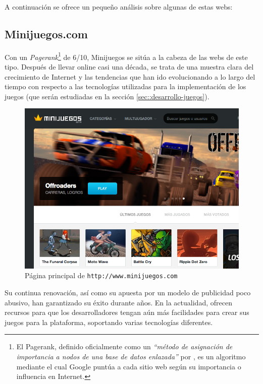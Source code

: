 A continuación se ofrece un pequeño análisis sobre algunas de estas webs:

\subsection*{Minijuegos.com}

Con un {\it Pagerank}\footnote{El Pagerank, definido oficialmente como un {\it ``método de asignación de importancia a nodos de una base de datos enlazada''} por \cite{Lawrence2007}, es un algoritmo mediante el cual Google puntúa a cada sitio web según su importancia o influencia en Internet.} de 6/10, Minijuegos \cite{Minijuegos} se sitúa a la cabeza de las webs de este tipo. Después de llevar online casi una década, se trata de una muestra clara del crecimiento de Internet y las tendencias que han ido evolucionando a lo largo del tiempo con respecto a las tecnologías utilizadas para la implementación de los juegos (que serán estudiadas en la sección \ref{sec::desarrollo-juegos}).

\begin{figure}[h]
  \begin{center}
    \includegraphics[width=\textwidth]{images/minijuegos.png}
    \caption{Página principal de {\tt http://www.minijuegos.com}}
  \end{center}
\end{figure}

Su continua renovación, así como su apuesta por un modelo de publicidad poco abusivo, han garantizado su éxito durante años. En la actualidad, ofrecen recursos para que los desarrolladores tengan aún más facilidades para crear sus juegos para la plataforma, soportando varias tecnologías diferentes.

